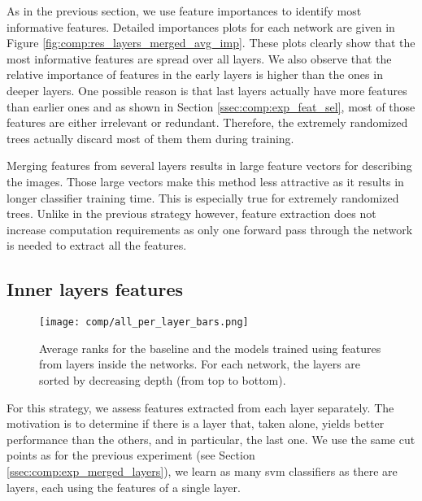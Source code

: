 As in the previous section, we use feature importances to identify most informative features. Detailed importances plots for each network are given in Figure \ref{fig:comp:res_layers_merged_avg_imp}. These plots clearly show that the most informative features are spread over all layers. We also observe that the relative importance of features in the early layers is higher than the ones in deeper layers. One possible reason is that last layers actually have more features than earlier ones and as shown in Section \ref{ssec:comp:exp_feat_sel}, most of those features are either irrelevant or redundant. Therefore, the extremely randomized trees actually discard most of them them during training. 

Merging features from several layers results in large feature vectors for describing the images. Those large vectors make this method less attractive as it results in longer classifier training time. This is especially true for extremely randomized trees. Unlike in the previous strategy however, feature extraction does not increase computation requirements as only one forward pass through the network is needed to extract all the features.

\subsection{Inner layers features}
\label{ssec:comp:exp_inner_layers}

\begin{figure}
    \center 
    \texttt{[image: comp/all\_per\_layer\_bars.png]}
    \caption{Average ranks for the baseline and the models trained using features from layers inside the networks. For each network, the layers are sorted by decreasing depth (from top to bottom).}
    \label{fig:comp:res_avg_ranks_per_layer}
\end{figure}
 
For this strategy, we assess features extracted from each layer separately. The motivation is to determine if there is a layer that, taken alone, yields better performance than the others, and in particular, the last one. We use the same cut points as for the previous experiment (see Section \ref{ssec:comp:exp_merged_layers}), we learn as many \acrshort{svm} classifiers as there are layers, each using the features of a single layer.

